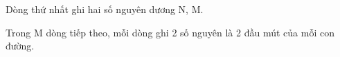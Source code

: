 Dòng thứ nhất ghi hai số nguyên dương N, M.  

   Trong M dòng tiếp theo, mỗi dòng ghi 2 số nguyên là 2 đầu mút của mỗi con đường.
